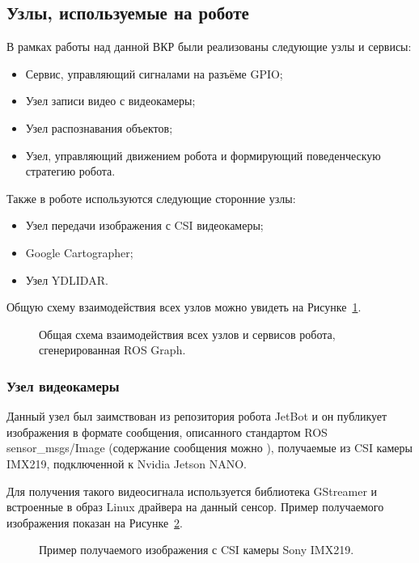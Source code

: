 \subsection{Узлы, используемые на роботе}
В рамках работы над данной ВКР были реализованы следующие узлы и сервисы:
\begin{itemize}
\item Сервис, управляющий сигналами на разъёме GPIO; 
\item Узел записи видео с видеокамеры;
\item Узел распознавания объектов;
\item Узел, управляющий движением робота и формирующий поведенческую стратегию робота.
\end{itemize}

Также в роботе используются следующие сторонние узлы:
\begin{itemize}
\item Узел передачи изображения с CSI видеокамеры;
\item Google Cartographer;
\item Узел YDLIDAR.
\end{itemize}


Общую схему взаимодействия всех узлов можно увидеть на Рисунке~\ref{fig:rosgraph}.

\begin{figure}[ht]
  \caption{Общая схема взаимодействия всех узлов и сервисов робота, сгенерированная ROS Graph.}\label{fig:rosgraph}
\end{figure}

\subsubsection{Узел видеокамеры}
Данный узел был заимствован из репозитория робота JetBot и он публикует изображения в формате сообщения, описанного стандартом ROS sensor\_msgs/Image (содержание сообщения можно ), получаемые из CSI камеры IMX219, подключенной к Nvidia Jetson NANO. 

Для получения такого видеосигнала используется библиотека GStreamer и встроенные в образ Linux драйвера на данный сенсор. Пример получаемого изображения показан на Рисунке~\ref{fig:robot-camera-test}.

\begin{figure}[ht]
  \caption{Пример получаемого изображения с CSI камеры Sony IMX219.}\label{fig:robot-camera-test}
\end{figure}

